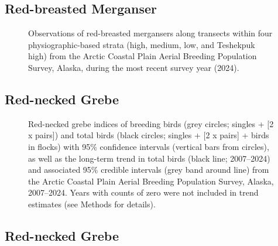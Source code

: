 \documentclass[
]{article}
\begin{document}
\endgroup{}

\newpage{}

\subsection*{Red-breasted Merganser}\label{red-breasted-merganser-2}

\begin{figure}


\caption{\label{fig-RBMEmap}Observations of red-breasted mergansers
along transects within four physiographic-based strata (high, medium,
low, and Teshekpuk high) from the Arctic Coastal Plain Aerial Breeding
Population Survey, Alaska, during the most recent survey year (2024).}

\end{figure}%

\newpage{}

\subsection*{Red-necked Grebe}\label{red-necked-grebe}

\begin{figure}


\caption{\label{fig-RNGR}Red-necked grebe indices of breeding birds
(grey circles; singles + {[}2 x pairs{]}) and total birds (black
circles; singles + {[}2 x pairs{]} + birds in flocks) with 95\%
confidence intervals (vertical bars from circles), as well as the
long-term trend in total birds (black line; 2007--2024) and associated
95\% credible intervals (grey band around line) from the Arctic Coastal
Plain Aerial Breeding Population Survey, Alaska, 2007--2024. Years with
counts of zero were not included in trend estimates (see Methods for
details).}

\end{figure}%

\newpage{}

\subsection*{Red-necked Grebe}\label{red-necked-grebe-1}
\end{document}
